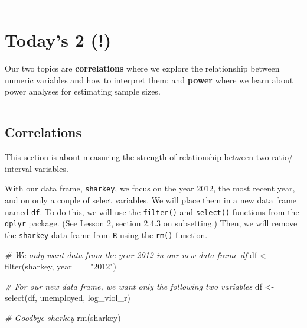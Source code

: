\documentclass[
]{book}
\newenvironment{Shaded}{\begin{snugshade}}{\end{snugshade}}
\newcommand{\CommentTok}[1]{\textcolor[rgb]{0.56,0.35,0.01}{\textit{#1}}}
\newcommand{\FunctionTok}[1]{\textcolor[rgb]{0.00,0.00,0.00}{#1}}
\newcommand{\NormalTok}[1]{#1}
\newcommand{\OtherTok}[1]{\textcolor[rgb]{0.56,0.35,0.01}{#1}}
\newcommand{\SpecialCharTok}[1]{\textcolor[rgb]{0.00,0.00,0.00}{#1}}
\newcommand{\StringTok}[1]{\textcolor[rgb]{0.31,0.60,0.02}{#1}}
\begin{document}
\begin{center}\rule{0.5\linewidth}{0.5pt}\end{center}

\hypertarget{todays-2}{%
\section{Today's 2 (!)}\label{todays-2}}

Our two topics are \textbf{correlations} where we explore the relationship between numeric variables and how to interpret them; and \textbf{power} where we learn about power analyses for estimating sample sizes.

\begin{center}\rule{0.5\linewidth}{0.5pt}\end{center}

\hypertarget{correlations}{%
\subsection{Correlations}\label{correlations}}

This section is about measuring the strength of relationship between two ratio/ interval variables.

With our data frame, \texttt{sharkey}, we focus on the year 2012, the most recent year, and on only a couple of select variables. We will place them in a new data frame named \texttt{df}. To do this, we will use the \texttt{filter()} and \texttt{select()} functions from the \texttt{dplyr} package. (See Lesson 2, section 2.4.3 on subsetting.) Then, we will remove the \texttt{sharkey} data frame from \texttt{R} using the \texttt{rm()} function.

\begin{Shaded}
\begin{Highlighting}[]
\CommentTok{\# We only want data from the year 2012 in our new data frame  \textasciigrave{}df\textasciigrave{}}
\NormalTok{df }\OtherTok{\textless{}{-}} \FunctionTok{filter}\NormalTok{(sharkey, year }\SpecialCharTok{==} \StringTok{"2012"}\NormalTok{) }

\CommentTok{\# For our new data frame, we want only the following two variables}
\NormalTok{df }\OtherTok{\textless{}{-}} \FunctionTok{select}\NormalTok{(df, unemployed, log\_viol\_r) }

\CommentTok{\# Goodbye sharkey}
\FunctionTok{rm}\NormalTok{(sharkey)}
\end{Highlighting}
\end{Shaded}
\end{document}
